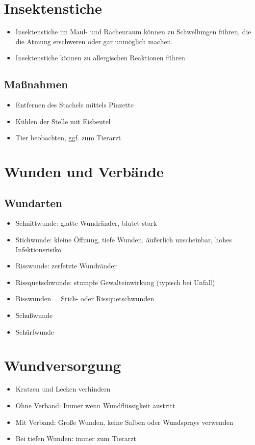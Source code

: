 \section{Insektenstiche}
    \begin{itemize}
        \item Insektenstiche im Maul- und Rachenraum können zu Schwellungen führen, die die Atmung erschweren oder gar unmöglich machen.
        \item Insektenstiche können zu allergischen Reaktionen führen
    \end{itemize}

    \subsection{Maßnahmen}
        \begin{itemize}
            \item Entfernen des Stachels mittels Pinzette
            \item Kühlen der Stelle mit Eisbeutel
            \item Tier beobachten, ggf. zum Tierarzt
        \end{itemize}

\section{Wunden und Verbände}
    \subsection{Wundarten}
        \begin{itemize}
            \item Schnittwunde: glatte Wundränder, blutet stark
            \item Stichwunde: kleine Öffnung, tiefe Wunden, äußerlich unscheinbar, hohes Infektionsrisiko
            \item Risswunde: zerfetzte Wundränder
            \item Rissquetschwunde: stumpfe Gewalteinwirkung (typisch bei Unfall)
            \item Bisswunden = Stich- oder Rissquetschwunden
            \item Schußwunde
            \item Schürfwunde
        \end{itemize}

\section{Wundversorgung}
    \begin{itemize}
        \item Kratzen und Lecken verhindern
        \item Ohne Verband: Immer wenn Wundflüssigkeit austritt
        \item Mit Verband: Große Wunden, keine Salben oder Wundsprays verwenden
        \item Bei tiefen Wunden: immer zum Tierarzt
    \end{itemize}

